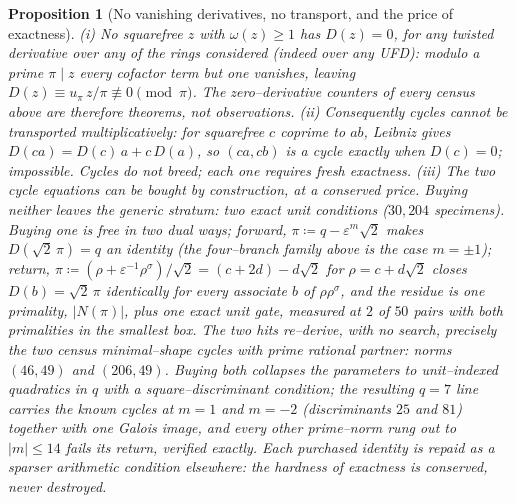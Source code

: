 \documentclass[11pt]{article}
\newtheorem{proposition}[theorem]{Proposition}
\theoremstyle{definition}
\begin{document}
\begin{proposition}[No vanishing derivatives, no transport, and the price of exactness]\label{prop:novanish}
\textup{(i)} No squarefree $z$ with $\omega(z)\ge1$ has $D(z)=0$, for any twisted derivative over any of
the rings considered (indeed over any UFD): modulo a prime $\pi\mid z$ every cofactor term but one
vanishes, leaving $D(z)\equiv u_\pi\,z/\pi\not\equiv0\pmod\pi$. The zero--derivative counters of every
census above are therefore theorems, not observations. \textup{(ii)} Consequently cycles cannot be
transported multiplicatively: for squarefree $c$ coprime to $ab$, Leibniz gives $D(ca)=D(c)\,a+c\,D(a)$,
so $(ca,cb)$ is a cycle exactly when $D(c)=0$; impossible. Cycles do not breed; each one requires
fresh exactness. \textup{(iii)} The two cycle equations can be bought by construction, at a conserved
price. Buying \emph{neither} leaves the generic stratum: two exact unit conditions ($30{,}204$
specimens). Buying \emph{one} is free in two dual ways; forward, $\pi\coloneqq q-\varepsilon^m\sqrt2$
makes $D(\sqrt2\,\pi)=q$ an identity (the four--branch family above is the case $m=\pm1$); return,
$\pi\coloneqq(\rho+\varepsilon^{-1}\rho^\sigma)/\sqrt2=(c+2d)-d\sqrt2$ for $\rho=c+d\sqrt2$ closes
$D(b)=\sqrt2\,\pi$ identically for every associate $b$ of $\rho\rho^\sigma$, and the residue is one
primality, $|N(\pi)|$, plus one exact unit gate, measured at $2$ of $50$ pairs with both primalities in
the smallest box. The two hits re--derive, with no search, precisely the two census minimal--shape cycles
with prime rational partner: norms $(46,49)$ and $(206,49)$. Buying \emph{both} collapses the parameters
to unit--indexed quadratics in $q$ with a square--discriminant condition; the resulting $q=7$ line
carries the known cycles at $m=1$ and $m=-2$ (discriminants $25$ and $81$) together with one Galois
image, and every other prime--norm rung out to $|m|\le14$ fails its return, verified exactly. Each
purchased identity is repaid as a sparser arithmetic condition elsewhere: the hardness of exactness is
conserved, never destroyed.
\end{proposition}
\end{document}
